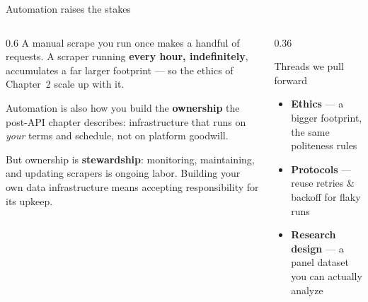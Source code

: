 \documentclass[9pt,aspectratio=169]{beamer}
\begin{document}
\begin{frame}{Automation raises the stakes}
    \begin{columns}[T]
        \begin{column}{0.6\textwidth}
            A manual scrape you run once makes a handful of requests. A scraper running \textbf{every hour, indefinitely}, accumulates a far larger footprint --- so the ethics of Chapter~2 scale up with it.

            \vspace{0.9em}

            Automation is also how you build the \textbf{ownership} the post-API chapter describes: infrastructure that runs on \textit{your} terms and schedule, not on platform goodwill.

            \vspace{0.9em}

            But ownership is \textbf{stewardship}: monitoring, maintaining, and updating scrapers is ongoing labor. Building your own data infrastructure means accepting responsibility for its upkeep.
        \end{column}
        \begin{column}{0.36\textwidth}
            \begin{block}{Threads we pull forward}
                \footnotesize
                \begin{itemize}\footnotesize
                    \item \textbf{Ethics} --- a bigger footprint, the same politeness rules
                    \item \textbf{Protocols} --- reuse retries \& backoff for flaky runs
                    \item \textbf{Research design} --- a panel dataset you can actually analyze
                \end{itemize}
            \end{block}
        \end{column}
    \end{columns}
\end{frame}
\end{document}
